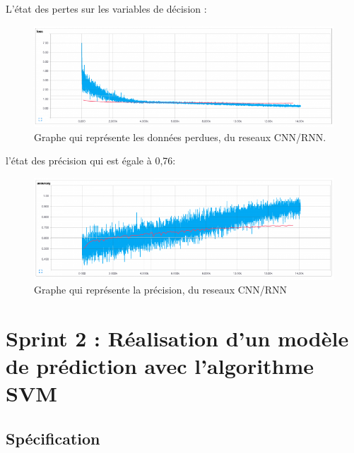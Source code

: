  L’état des pertes sur les variables de décision :

\begin{figure}[H]
	\begin{center}
	\includegraphics[width=\linewidth]{Images/cnn4.png}
	\end{center}
	\caption{Graphe qui représente les données perdues, du reseaux CNN/RNN.}
	\label{fig:rnn}
\end{figure}
 l'état des précision qui est égale à 0,76:
\begin{figure}[H]
	\begin{center}
	\includegraphics[width=\linewidth]{Images/cnn5.png}
	\end{center}
	\caption{Graphe qui représente la précision, du reseaux CNN/RNN}
	\label{fig:rnn}
\end{figure}




\chapter{Sprint 2 : Réalisation d’un modèle de prédiction avec l’algorithme SVM}
\label{Chapitre 5} %


\section{Spécification}
